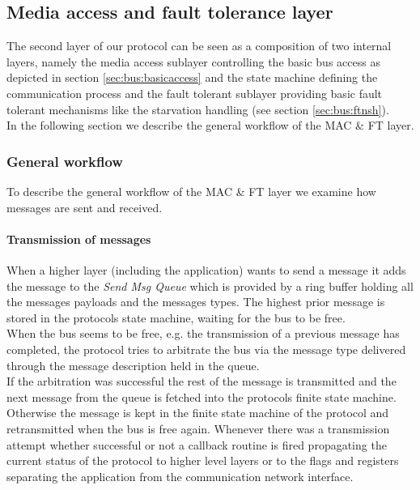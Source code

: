 \subsection{Media access and fault tolerance layer}
\label{sec:bus:design:layer2}

The second layer of our protocol can be seen as a composition of two internal layers, 
namely the media access sublayer controlling the basic bus access as depicted in section 
\ref{sec:bus:basicaccess}  and the state machine defining 
the communication process and the fault tolerant sublayer providing basic fault 
tolerant mechanisms like the starvation handling (see section \ref{sec:bus:ftnsh}).\\

In the following section we describe the general workflow of the MAC \& FT layer.

\subsubsection{General workflow}
To describe the general workflow of the MAC \& FT layer we examine how messages are sent and received.\\

\paragraph{Transmission of messages}
When a higher layer (including the application) wants to send a message it adds the message to the \textit{Send Msg Queue} which is provided
by a ring buffer holding all the messages payloads and the messages types. The highest prior message is stored in the protocols state machine, waiting for the bus to be free.\\

When the bus seems to be free, e.g. the transmission of a previous message has completed, the protocol tries to arbitrate the bus via the message type delivered through the message description held in the queue.\\

If the arbitration was successful the rest of the message is transmitted and the next message from the queue is fetched into the protocols finite state machine. Otherwise the message is kept in the finite state machine of the protocol and retransmitted when the bus is free again.
Whenever there was a transmission attempt whether successful or not a callback routine is fired propagating the current status of the protocol to higher level layers or to the flags and registers separating the application from the communication network interface.\\

